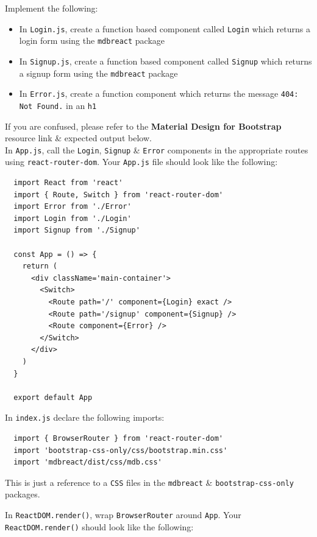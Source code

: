 \documentclass{article}
\begin{document}
Implement the following:
\begin{itemize}
  \item In \texttt{Login.js}, create a function based component called \texttt{Login} which returns a login form using the \texttt{mdbreact} package
  \item In \texttt{Signup.js}, create a function based component called \texttt{Signup} which returns a signup form using the \texttt{mdbreact} package
  \item In \texttt{Error.js}, create a function component which returns the message \texttt{404: Not Found.} in an \texttt{h1}
\end{itemize}

If you are confused, please refer to the \textbf{Material Design for Bootstrap} resource link \& expected output below. \\

In \texttt{App.js}, call the \texttt{Login}, \texttt{Signup} \& \texttt{Error} components in the appropriate routes using \texttt{react-router-dom}. Your \texttt{App.js} file should look like the following:

\begin{verbatim}
  import React from 'react'
  import { Route, Switch } from 'react-router-dom'
  import Error from './Error'
  import Login from './Login'
  import Signup from './Signup'
  
  const App = () => {
    return (
      <div className='main-container'>
        <Switch>
          <Route path='/' component={Login} exact />
          <Route path='/signup' component={Signup} />
          <Route component={Error} />
        </Switch>
      </div>
    )
  }
  
  export default App   
\end{verbatim}

In \texttt{index.js} declare the following imports:

\begin{verbatim}
  import { BrowserRouter } from 'react-router-dom'
  import 'bootstrap-css-only/css/bootstrap.min.css'
  import 'mdbreact/dist/css/mdb.css'
\end{verbatim}

This is just a reference to a \texttt{CSS} files in the \texttt{mdbreact} \& \texttt{bootstrap-css-only} packages.

In \texttt{ReactDOM.render()}, wrap \texttt{BrowserRouter} around \texttt{App}. Your \texttt{ReactDOM.render()} should look like the following:
\end{document}

